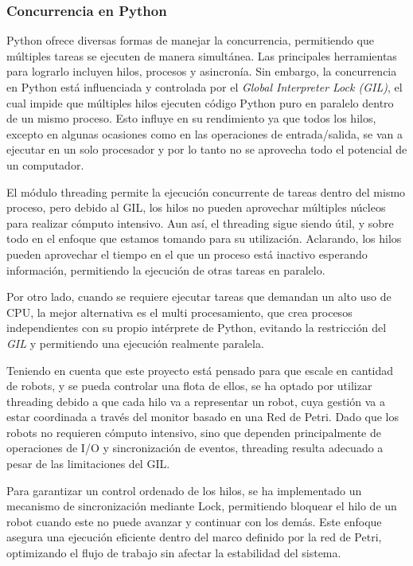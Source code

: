 \subsubsection{Concurrencia en Python}

Python ofrece diversas formas de manejar la concurrencia, permitiendo que múltiples tareas se ejecuten de manera simultánea. Las principales herramientas para lograrlo incluyen hilos, procesos y asincronía. Sin embargo, la concurrencia en Python está influenciada y controlada por el \textit{Global Interpreter Lock (GIL)}, el cual impide que múltiples hilos ejecuten código Python puro en paralelo dentro de un mismo proceso. Esto influye en su rendimiento ya que todos los hilos, excepto en algunas ocasiones como en las operaciones de entrada/salida, se van a ejecutar en un solo procesador y por lo tanto no se aprovecha todo el potencial de un computador. \cite{lanaro2017python}

El módulo threading permite la ejecución concurrente de tareas dentro del mismo proceso, pero debido al GIL, los hilos no pueden aprovechar múltiples núcleos para realizar cómputo intensivo. Aun así, el threading sigue siendo útil, y sobre todo en el enfoque que estamos tomando para su utilización. Aclarando, los hilos pueden aprovechar el tiempo en el que un proceso está inactivo esperando información, permitiendo la ejecución de otras tareas en paralelo.

Por otro lado, cuando se requiere ejecutar tareas que demandan un alto uso de CPU, la mejor alternativa es el multi procesamiento, que crea procesos independientes con su propio intérprete de Python, evitando la restricción del \textit{GIL} y permitiendo una ejecución realmente paralela.

Teniendo en cuenta que este proyecto está pensado para que escale en cantidad de robots, y se pueda controlar una flota de ellos, se ha optado por utilizar threading debido a que cada hilo va a representar un robot, cuya gestión va a estar coordinada a través del monitor basado en una Red de Petri. Dado que los robots no requieren cómputo intensivo, sino que dependen principalmente de operaciones de I/O y sincronización de eventos, threading resulta adecuado a pesar de las limitaciones del GIL.

Para garantizar un control ordenado de los hilos, se ha implementado un mecanismo de sincronización mediante Lock, permitiendo bloquear el hilo de un robot cuando este no puede avanzar y continuar con los demás. Este enfoque asegura una ejecución eficiente dentro del marco definido por la red de Petri, optimizando el flujo de trabajo sin afectar la estabilidad del sistema.